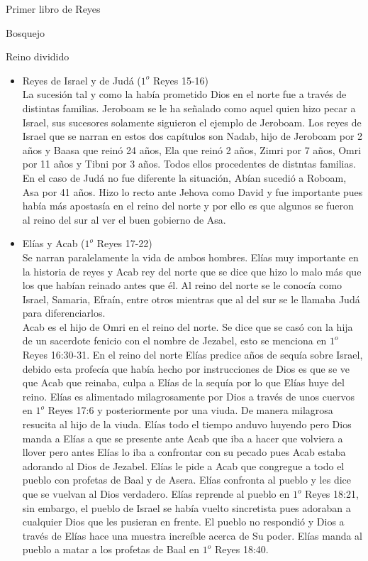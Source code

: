 \begin{section}{Primer libro de Reyes}
\begin{subsection}{Bosquejo}
\begin{subsubsection}{Reino dividido}
\begin{itemize}
				\item Reyes de Israel y de Judá ($1^{o}$ Reyes 15-16)\\
					La sucesión tal y como la había prometido Dios en el norte fue a través de distintas familias. Jeroboam se le ha señalado como aquel quien hizo pecar a Israel, sus sucesores solamente siguieron el ejemplo de Jeroboam. Los reyes de Israel que se narran en estos dos capítulos son Nadab, hijo de Jeroboam por 2 años y Baasa que reinó 24 años, Ela que reinó 2 años, Zimri por 7 años, Omri por 11 años y Tibni por 3 años. Todos ellos procedentes de distntas familias. En el caso de Judá no fue diferente la situación, Abían sucedió a Roboam, Asa por 41 años. Hizo lo recto ante Jehova como David y fue importante pues había más apostasía en el reino del norte y por ello es que algunos se fueron al reino del sur al ver el buen gobierno de Asa.\\
				\item Elías y Acab ($1^{o}$ Reyes 17-22)\\
					Se narran paralelamente la vida de ambos hombres. Elías muy importante en la historia de reyes y Acab rey del norte que se dice que hizo lo malo más que los que habían reinado antes que él. Al reino del norte se le conocía como Israel, Samaria, Efraín, entre otros mientras que al del sur se le llamaba Judá para diferenciarlos.\\
					Acab es el hijo de Omri en el reino del norte. Se dice que se casó con la hija de un sacerdote fenicio con el nombre de Jezabel, esto se menciona en $1^{o}$ Reyes 16:30-31.
					\newpage
					En el reino del norte Elías predice años de sequía sobre Israel, debido esta profecía que había hecho por instrucciones de Dios es que se ve que Acab que reinaba, culpa a Elías de la sequía por lo que Elías huye del reino. Elías es alimentado milagrosamente por Dios a través de unos cuervos en $1^{o}$ Reyes 17:6 y posteriormente por una viuda. De manera milagrosa resucita al hijo de la viuda. Elías todo el tiempo anduvo huyendo pero Dios manda a Elías a que se presente ante Acab que iba a hacer que volviera a llover pero antes Elías lo iba a confrontar con su pecado pues Acab estaba adorando al Dios de Jezabel. Elías le pide a Acab que congregue a todo el pueblo con profetas de Baal y de Asera. Elías confronta al pueblo y les dice que se vuelvan al Dios verdadero. Elías reprende al pueblo en $1^{o}$ Reyes 18:21, sin embargo, el pueblo de Israel se había vuelto sincretista pues adoraban a cualquier Dios que les pusieran en frente. El pueblo no respondió y Dios a través de Elías hace una muestra increíble acerca de Su poder. Elías manda al pueblo a matar a los profetas de Baal en $1^{o}$ Reyes 18:40.\\ \\

\end{itemize}
\end{subsubsection}
\end{subsection}
\end{section}
